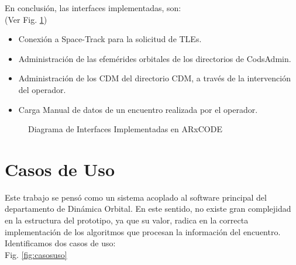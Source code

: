 En conclusi\'on, las interfaces implementadas, son:\\
 (Ver Fig. \ref{fig:interfacesImpl})\\
\begin{itemize}
\itemsep0em
 \item Conexi\'on a Space-Track para la solicitud de TLEs.
 \item Administraci\'on de las efem\'erides orbitales de los directorios de CodsAdmin.
 \item Administraci\'on de los CDM del directorio CDM, a trav\'es de la intervenci\'on del operador.
 \item Carga Manual de datos de un encuentro realizada por el operador.
\end{itemize}

\begin{figure}
\centering
  \caption[Diagrama de Interfaces Implementadas en ARxCODE]{Diagrama de Interfaces Implementadas en ARxCODE}
  \label{fig:interfacesImpl}
\end{figure}

\section{Casos de Uso}



Este trabajo se pens\'o como un sistema acoplado al software principal del departamento de Din\'amica Orbital. En este sentido, no existe gran complejidad en la estructura del prototipo, ya que su valor, radica en la correcta implementaci\'on de los algoritmos que procesan la informaci\'on del encuentro. Identificamos dos casos de uso:\\
Fig. \ref{fig:casosuso}
 
